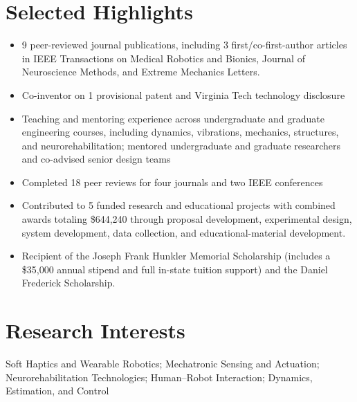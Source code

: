 \documentclass[10pt, letterpaper]{article}
\newenvironment{highlights}{
    \begin{itemize}[
        topsep=0.10 cm,
        parsep=0.10 cm,
        partopsep=0pt,
        itemsep=0pt,
        leftmargin=0.2 cm + 10pt
    ]
}{
    \end{itemize}
} %
\let\hrefWithoutArrow\href
\renewcommand{\href}[2]{\hrefWithoutArrow{#1}{#2}}
\begin{document}
\section{Selected Highlights}
\begin{highlights}
    \item 9 peer-reviewed journal publications, including 3 first/co-first-author articles in IEEE Transactions on Medical Robotics and Bionics, Journal of Neuroscience Methods, and Extreme Mechanics Letters.
    \item Co-inventor on 1 provisional patent and Virginia Tech technology disclosure %
    \item Teaching and mentoring experience across undergraduate and graduate engineering courses, including dynamics, vibrations, mechanics, structures, and neurorehabilitation; mentored undergraduate and graduate researchers and co-advised senior design teams
    \item Completed 18 peer reviews for four journals and two IEEE conferences %
    \item Contributed to 5 funded research and educational projects with combined awards totaling \$644,240 through proposal development, experimental design, system development, data collection, and educational-material development.
    \item Recipient of the Joseph Frank Hunkler Memorial Scholarship (includes a \$35,000 annual stipend and full in-state tuition support) and the Daniel Frederick Scholarship.
\end{highlights}

\vspace{-.8em}
\section{Research Interests}
\vspace{-.2em}
Soft Haptics and Wearable Robotics; Mechatronic Sensing and Actuation; Neurorehabilitation Technologies; Human–Robot Interaction; Dynamics, Estimation, and Control
\vspace{-.6em}
\end{document}
